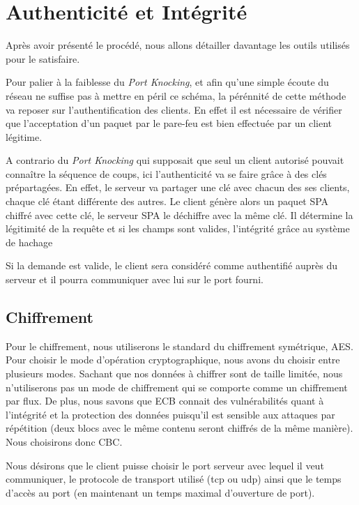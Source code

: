\chapter{Authenticité et Intégrité}
Après avoir présenté le procédé, nous allons détailler davantage les outils utilisés pour le satisfaire.

Pour palier à la faiblesse du \emph{Port Knocking}, et afin qu'une simple écoute du réseau ne suffise pas à mettre en péril ce schéma, la pérénnité de cette méthode va reposer sur l'authentification des clients. En effet il est nécessaire de vérifier que l'acceptation d'un paquet par le pare-feu est bien effectuée par un client légitime.

A contrario du \emph{Port Knocking} qui supposait que seul un client autorisé pouvait connaître la séquence de coups, ici l'authenticité va se faire grâce à des clés prépartagées. En effet, le serveur va partager une clé avec chacun des ses clients, chaque clé étant différente des autres. 
Le client génère alors un paquet SPA chiffré avec cette clé, le serveur SPA le déchiffre avec la même clé. Il détermine la légitimité de la requête et si les champs sont valides, l'intégrité grâce au système de hachage

Si la demande est valide, le client sera considéré comme authentifié auprès du serveur et il pourra communiquer avec lui sur le port fourni.

\section{Chiffrement}

Pour le chiffrement, nous utiliserons le standard du chiffrement symétrique, AES. 
Pour choisir le mode d'opération cryptographique, nous avons du choisir entre plusieurs modes. 
Sachant que nos données à chiffrer sont de taille limitée, nous n'utiliserons pas un mode de chiffrement qui se comporte comme un chiffrement par flux.
De plus, nous savons que ECB connait des vulnérabilités quant à l'intégrité et la protection des données puisqu'il est sensible aux attaques par répétition (deux blocs avec le même contenu seront chiffrés de la même manière).
Nous choisirons donc CBC.


Nous désirons que le client puisse choisir le port serveur avec lequel il veut communiquer, le protocole de transport utilisé (tcp ou udp) ainsi que le temps d'accès au port (en maintenant un temps maximal d'ouverture de port).

